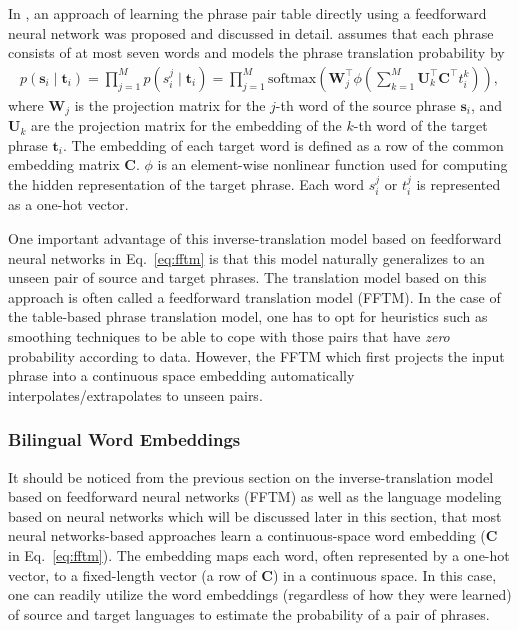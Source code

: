 \documentclass[11pt, oneside]{essay}
\newcommand{\softmax}{\text{softmax}}
\newcommand{\vect}[1]{\mathbf{#1}}
\newcommand{\matr}[1]{\mathbf{#1}}
\newcommand{\vs}[0]{\vect{s}}
\newcommand{\vt}[0]{\vect{t}}
\newcommand{\mW}[0]{\matr{W}}
\newcommand{\mU}[0]{\matr{U}}
\newcommand{\mC}{\matr{C}}
\begin{document}
In \citep{Schwenk2012,Son2012,Carpuat2007}, an approach of learning the phrase
pair table directly using a feedforward neural network was
proposed and discussed in detail. \citet{Schwenk2012} assumes that
each phrase consists of at most seven words and models the phrase
translation probability by
\begin{align}
\label{eq:fftm}
p(\vs_i \mid \vt_i) = \prod_{j=1}^M p(s_i^j \mid \vt_i) 
                     = \prod_{j=1}^M \softmax\left( \mW_j^\top
                             \phi \left( \sum_{k=1}^M \mU_k^\top
                                 \mC^\top t_i^k  \right) \right),
\end{align}
where $\mW_j$ is the projection matrix for the $j$-th word of the
source phrase $\vs_i$, and $\mU_k$ are the projection
matrix for the embedding of the $k$-th word of the target phrase
$\vt_i$. The embedding of each target word is defined as a row of
the common embedding matrix $\mC$. $\phi$ is an element-wise
nonlinear function used for computing the hidden representation
of the target phrase. Each word $s_i^j$ or $t_i^j$ is represented
as a one-hot vector.

One important advantage of this inverse-translation model based
on feedforward neural networks in Eq.~\eqref{eq:fftm} is that
this model naturally generalizes to an unseen pair of source and
target phrases. The translation model based on this approach is
often called a feedforward translation model (FFTM). In the case
of the table-based phrase translation model, one has to opt for
heuristics such as smoothing techniques to be able to cope with
those pairs that have \textit{zero} probability according to
data. However, the FFTM which first projects the input phrase
into a continuous space embedding automatically
interpolates/extrapolates to unseen pairs.


\subsubsection{Bilingual Word Embeddings}
\label{sec:biembed}

It should be noticed from the previous section on the
inverse-translation model based on feedforward neural networks
(FFTM) as well as the language modeling based on neural networks
which will be discussed later in this section, that most neural
networks-based approaches learn a continuous-space word embedding
($\mC$ in Eq.~\eqref{eq:fftm}). The embedding maps each word,
often represented by a one-hot vector, to a fixed-length
vector (a row of $\mC$) in a continuous space.  In this case,
one can readily utilize the word embeddings (regardless of how
they were learned) of source and target languages to
estimate the probability of a pair of phrases. 
\end{document}
